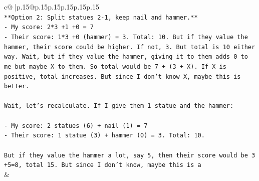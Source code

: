 \documentclass{article}
\begin{document}
{\begin{supertabular}{c@{$\;$}|p{.15\linewidth}@{}p{.15\linewidth}p{.15\linewidth}p{.15\linewidth}p{.15\linewidth}p{.15\linewidth}}
{{{\\ 
\texttt{**Option 2: Split statues 2{-}1, keep nail and hammer.**} \\
\texttt{{-} My score: 2*3 +1 +0 = 7} \\
\texttt{{-} Their score: 1*3 +0 (hammer) = 3. Total: 10. But if they value the hammer, their score could be higher. If not, 3. But total is 10 either way. Wait, but if they value the hammer, giving it to them adds 0 to me but maybe X to them. So total would be 7 + (3 + X). If X is positive, total increases. But since I don't know X, maybe this is better.} \\
\\ 
\texttt{Wait, let's recalculate. If I give them 1 statue and the hammer:} \\
\\ 
\texttt{{-} My score: 2 statues (6) + nail (1) = 7} \\
\texttt{{-} Their score: 1 statue (3) + hammer (0) = 3. Total: 10.} \\
\\ 
\texttt{But if they value the hammer a lot, say 5, then their score would be 3 +5=8, total 15. But since I don't know, maybe this is a} \\
            }
        }
    }
    & \\ \\


\end{supertabular}}
\end{document}
